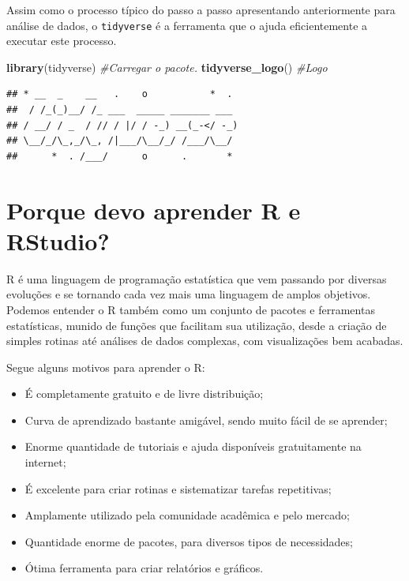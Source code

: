 \documentclass[]{book}
\newenvironment{Shaded}{\begin{snugshade}}{\end{snugshade}}
\newcommand{\CommentTok}[1]{\textcolor[rgb]{0.56,0.35,0.01}{\textit{#1}}}
\newcommand{\KeywordTok}[1]{\textcolor[rgb]{0.13,0.29,0.53}{\textbf{#1}}}
\newcommand{\NormalTok}[1]{#1}
\providecommand{\tightlist}{%
  \setlength{\itemsep}{0pt}\setlength{\parskip}{0pt}}
\begin{document}
Assim como o processo típico do passo a passo apresentando anteriormente para análise de dados, o \texttt{tidyverse} é a ferramenta que o ajuda eficientemente a executar este processo.

\begin{Shaded}
\begin{Highlighting}[]
\KeywordTok{library}\NormalTok{(tidyverse) }\CommentTok{#Carregar o pacote.}
\KeywordTok{tidyverse_logo}\NormalTok{() }\CommentTok{#Logo}
\end{Highlighting}
\end{Shaded}

\begin{verbatim}
## * __  _    __   .    o           *  . 
##  / /_(_)__/ /_ ___  _____ _______ ___ 
## / __/ / _  / // / |/ / -_) __(_-</ -_)
## \__/_/\_,_/\_, /|___/\__/_/ /___/\__/ 
##      *  . /___/      o      .       *
\end{verbatim}

\hypertarget{porque-devo-aprender-r-e-rstudio}{%
\section{Porque devo aprender R e RStudio?}\label{porque-devo-aprender-r-e-rstudio}}

R é uma linguagem de programação estatística que vem passando por diversas evoluções e se tornando cada vez mais uma linguagem de amplos objetivos. Podemos entender o R também como um conjunto de pacotes e ferramentas estatísticas, munido de funções que facilitam sua utilização, desde a criação de simples rotinas até análises de dados complexas, com visualizações bem acabadas.

Segue alguns motivos para aprender o R:

\begin{itemize}
\tightlist
\item
  É completamente gratuito e de livre distribuição;
\item
  Curva de aprendizado bastante amigável, sendo muito fácil de se aprender;
\item
  Enorme quantidade de tutoriais e ajuda disponíveis gratuitamente na internet;
\item
  É excelente para criar rotinas e sistematizar tarefas repetitivas;
\item
  Amplamente utilizado pela comunidade acadêmica e pelo mercado;
\item
  Quantidade enorme de pacotes, para diversos tipos de necessidades;
\item
  Ótima ferramenta para criar relatórios e gráficos.
\end{itemize}
\end{document}
